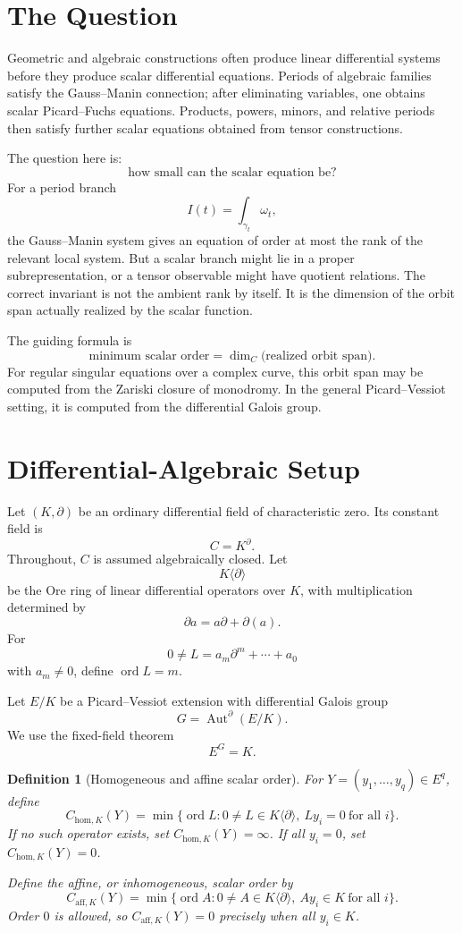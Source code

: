 \documentclass[11pt]{article}
\newtheorem{definition}[theorem]{Definition}
\DeclareMathOperator{\ord}{ord}
\begin{document}
\section{The Question}

Geometric and algebraic constructions often produce linear differential systems before they produce scalar differential equations. Periods of algebraic families satisfy the Gauss--Manin connection; after eliminating variables, one obtains scalar Picard--Fuchs equations. Products, powers, minors, and relative periods then satisfy further scalar equations obtained from tensor constructions.

The question here is:
\[
\text{how small can the scalar equation be?}
\]
For a period branch
\[
I(t)=\int_{\gamma_t}\omega_t,
\]
the Gauss--Manin system gives an equation of order at most the rank of the relevant local system. But a scalar branch might lie in a proper subrepresentation, or a tensor observable might have quotient relations. The correct invariant is not the ambient rank by itself. It is the dimension of the orbit span actually realized by the scalar function.

The guiding formula is
\[
\boxed{
\text{minimum scalar order}
=
\dim_C\text{(realized orbit span)}.
}
\]
For regular singular equations over a complex curve, this orbit span may be computed from the Zariski closure of monodromy. In the general Picard--Vessiot setting, it is computed from the differential Galois group.

\section{Differential-Algebraic Setup}

Let \((K,\partial)\) be an ordinary differential field of characteristic zero. Its constant field is
\[
C=K^\partial.
\]
Throughout, \(C\) is assumed algebraically closed. Let
\[
K\langle\partial\rangle
\]
be the Ore ring of linear differential operators over \(K\), with multiplication determined by
\[
\partial a=a\partial+\partial(a).
\]
For
\[
0\ne L=a_m\partial^m+\cdots+a_0
\]
with \(a_m\ne0\), define \(\ord L=m\).

Let \(E/K\) be a Picard--Vessiot extension with differential Galois group
\[
G=\operatorname{Aut}^\partial(E/K).
\]
We use the fixed-field theorem
\[
E^G=K.
\]

\begin{definition}[Homogeneous and affine scalar order]
For \(Y=(y_1,\ldots,y_q)\in E^q\), define
\[
C_{\mathrm{hom},K}(Y)
=
\min\{\ord L:0\ne L\in K\langle\partial\rangle,\ Ly_i=0\ \text{for all }i\}.
\]
If no such operator exists, set \(C_{\mathrm{hom},K}(Y)=\infty\). If all \(y_i=0\), set \(C_{\mathrm{hom},K}(Y)=0\).

Define the affine, or inhomogeneous, scalar order by
\[
C_{\mathrm{aff},K}(Y)
=
\min\{\ord A:0\ne A\in K\langle\partial\rangle,\ Ay_i\in K\ \text{for all }i\}.
\]
Order \(0\) is allowed, so \(C_{\mathrm{aff},K}(Y)=0\) precisely when all \(y_i\in K\).
\end{definition}
\end{document}
